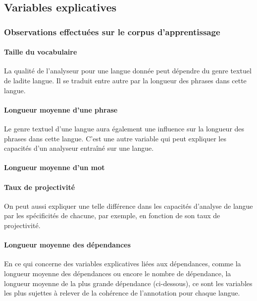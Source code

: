 \documentclass[a4paper, twoside]{article}
\begin{document}
    \subsection{Variables explicatives}

    \subsubsection{Observations effectuées sur le corpus d'apprentissage}

    \paragraph{Taille du vocabulaire}

    La qualité de l'analyseur pour une langue donnée peut dépendre du genre textuel de ladite langue. Il se traduit entre autre par la longueur des phrases dans cette langue.

    \paragraph{Longueur moyenne d'une phrase}

    Le genre textuel d'une langue aura également une influence sur la longueur des phrases dans cette langue. C'est une autre variable qui peut expliquer les capacités d'un analyseur entraîné sur une langue.

    \paragraph{Longueur moyenne d'un mot}

    \paragraph{Taux de projectivité}

    On peut aussi expliquer une telle différence dans les capacités d'analyse de langue par les spécificités de chacune, par exemple, en fonction de son taux de projectivité.

    \paragraph{Longueur moyenne des dépendances}

    En ce qui concerne des variables explicatives liées aux dépendances, comme la longueur moyenne des dépendances ou encore le nombre de dépendance, la longueur moyenne de la plus grande dépendance (ci-dessous), ce sont les variables les plus sujettes à relever de la cohérence de l'annotation pour chaque langue.
\end{document}
